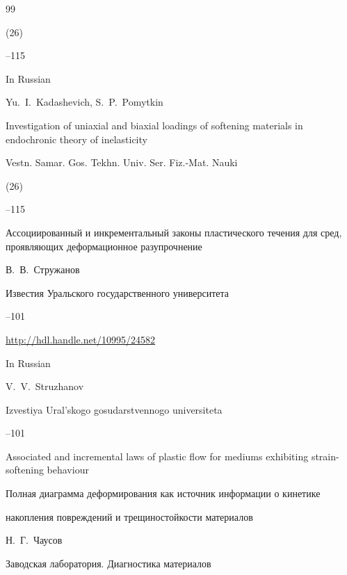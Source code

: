 \begin{thebibliography}{99}

(26)

--115



\misctransl

\lang In Russian

\by Yu.~I.~Kadashevich, S.~P.~Pomytkin

\paper Investigation of uniaxial and biaxial loadings of softening materials in endochronic theory of inelasticity

\jour Vestn. Samar. Gos. Tekhn. Univ. Ser. Fiz.-Mat. Nauki


(26)

--115




\paper Ассоциированный и инкрементальный законы пластического течения для сред, проявляющих деформационное разупрочнение

\by В.~В.~Стружанов

\jour Известия Уральского государственного университета



--101

\elink \url{http://hdl.handle.net/10995/24582}

\misctransl

\lang In Russian

\by V.~V.~Struzhanov

\jour Izvestiya Ural'skogo gosudarstvennogo universiteta



--101

\paper Associated and incremental laws of  plastic flow for mediums exhibiting strain-softening behaviour 




\paper Полная диаграмма деформирования как источник информации о кинетике 

накопления повреждений и трещиностойкости материалов

\by Н.~Г.~Чаусов

\jour Заводская лаборатория. Диагностика материалов


\end{thebibliography}
